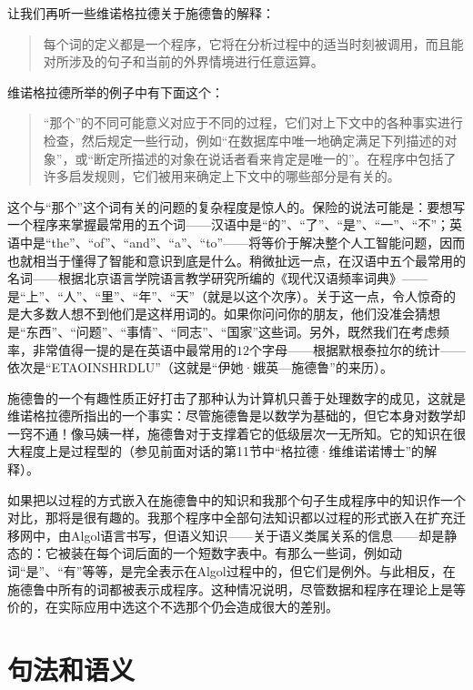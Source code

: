让我们再听一些维诺格拉德关于施德鲁的解释：

\begin{quote}
每个词的定义都是一个程序，它将在分析过程中的适当时刻被调用，而且能对所涉及的句子和当前的外界情境进行任意运算。
\end{quote}

维诺格拉德所举的例子中有下面这个：

\begin{quote}
“那个”的不同可能意义对应于不同的过程，它们对上下文中的各种事实进行检查，然后规定一些行动，例如“在数据库中唯一地确定满足下列描述的对象”，或“断定所描述的对象在说话者看来肯定是唯一的”。在程序中包括了许多启发规则，它们被用来确定上下文中的哪些部分是有关的。
\end{quote}

这个与“那个”这个词有关的问题的复杂程度是惊人的。保险的说法可能是：要想写一个程序来掌握最常用的五个词——汉语中是“的”、“了”、“是”、“一”、“不”；英语中是“the”、“of”、“and”、“a”、“to”——将等价于解决整个人工智能问题，因而也就相当于懂得了智能和意识到底是什么。稍微扯远一点，在汉语中五个最常用的名词——根据北京语言学院语言教学研究所编的《现代汉语频率词典》——是“上”、“人”、“里”、“年”、“天”（就是以这个次序）。关于这一点，令人惊奇的是大多数人想不到他们是这样用词的。如果你问问你的朋友，他们没准会猜想是“东西”、“问题”、“事情”、“同志”、“国家”这些词。另外，既然我们在考虑频率，非常值得一提的是在英语中最常用的$12$个字母——根据默根泰拉尔的统计——依次是“ETAOINSHRDLU”（这就是“伊她·娥英—施德鲁”的来历）。

施德鲁的一个有趣性质正好打击了那种认为计算机只善于处理数字的成见，这就是维诺格拉德所指出的一个事实：尽管施德鲁是以数学为基础的，但它本身对数学却一窍不通！像马姨一样，施德鲁对于支撑着它的低级层次一无所知。它的知识在很大程度上是过程型的（参见前面对话的第11节中“格拉德·维维诺诺博士”的解释）。

如果把以过程的方式嵌入在施德鲁中的知识和我那个句子生成程序中的知识作一个对比，那将是很有趣的。我那个程序中全部句法知识都以过程的形式嵌入在扩充迁移网中，由Algol语言书写，但语义知识——关于语义类属关系的信息——却是静态的：它被装在每个词后面的一个短数字表中。有那么一些词，例如动词“是”、“有”等等，是完全表示在Algol过程中的，但它们是例外。与此相反，在施德鲁中所有的词都被表示成程序。这种情况说明，尽管数据和程序在理论上是等价的，在实际应用中选这个不选那个仍会造成很大的差别。

\section{句法和语义}

